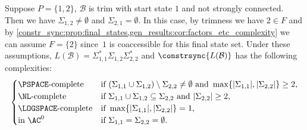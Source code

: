 \begin{theorem}
	\label{thm:two-state-classification}
	Suppose $P = \{1,2\}$, $\mathcal B$ is trim with start state $1$
	and not strongly connected. Then we have $\Sigma_{1,2} \ne \emptyset$
	and $\Sigma_{2,1} = \emptyset$.
	In this case, by trimness we have $2 \in F$
	and by \cref{constr_sync:prop:final_states,gen_results:cor:factors_etc_complexity} 
	we can assume $F = \{2\}$
	since~$1$ is coaccessible for this final state set.
	Under these assumptions, $L(\mathcal B) = \Sigma_{1,1}^* \Sigma_{1,2} \Sigma_{2,2}^*$ and $\constrsync{L(\mathcal B)}$
	has the following complexities:
	\[
	\begin{cases}
		\text{\PSPACE-complete} & \text{if } ( \Sigma_{1,1} \cup \Sigma_{1,2} ) \setminus \Sigma_{2,2} \ne \emptyset 
		\mbox{ and } \max\{ |\Sigma_{1,1}|, |\Sigma_{2,2}| \} \ge 2, \\
		\text{\NL-complete}        & \text{if } \Sigma_{1,1} \cup \Sigma_{1,2} \subseteq \Sigma_{2,2} \text{ and } |\Sigma_{2,2}|\ge 2, \\ %
		\text{\LOGSPACE-complete}  & \text{if } \max\{ |\Sigma_{1,1}|, |\Sigma_{2,2}| \} = 1, \\
		\text{in $\AC^0$} & \text{if } \Sigma_{1,1} = \Sigma_{2,2} = \emptyset.	
	\end{cases}	
	\]
\end{theorem}
